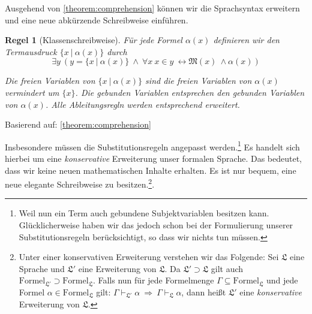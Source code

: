 \documentclass[a4paper,german,10pt,twoside]{book}
\newtheorem{rul}{Regel}
\theoremstyle{definition}
\theoremstyle{remark}
\begin{document}
\par
Ausgehend von \ref{theorem:comprehension} k{\"o}nnen wir die Sprachsyntax erweitern und eine neue abk{\"u}rzende Schreibweise einf{\"u}hren.

\begin{rul}[Klassenschreibweise]
\label{rule:classDefinition} \hypertarget{rule:classDefinition}{}
F{\"u}r jede Formel $\alpha(x)$ definieren wir den Termausdruck $\{ x \ | \ \alpha(x)\}$ durch 
$$
  \exists y \ (y = \{x \ | \ \alpha(x) \} \ \land \ \forall x \ x \in y \ \leftrightarrow \mathfrak{M}(x) \ \land \alpha(x))
$$

\par
Die freien Variablen von $\{ x \ | \ \alpha(x)\}$ sind die freien Variablen von $\alpha(x)$ vermindert um $\{ x \}$. Die gebunden Variablen entsprechen den gebunden Variablen von $\alpha(x)$. Alle Ableitungsregln werden entsprechend erweitert.
                
\end{rul}
Basierend auf: 
 \ref{theorem:comprehension}

Insbesondere m{\"u}ssen die Substitutionsregeln angepasst werden.\footnote{Weil nun ein Term auch gebundene Subjektvariablen besitzen kann. Gl{\"u}cklicherweise haben wir das jedoch schon bei der Formulierung unserer Substitutionsregeln ber{\"u}cksichtigt, so dass wir nichts tun m{\"u}ssen.} Es handelt sich hierbei um eine \emph{konservative} Erweiterung unser formalen Sprache. Das bedeutet, dass wir keine neuen mathematischen Inhalte erhalten. Es ist nur bequem, eine neue elegante Schreibweise zu besitzen.\footnote{
Unter einer konservativen Erweiterung  verstehen wir das Folgende: Sei $\mathfrak{L}$ eine Sprache und $\mathfrak{L'}$ eine Erweiterung von $\mathfrak{L}$. Da $\mathfrak{L'} \supset \mathfrak{L}$ gilt auch $\mbox{Formel}_\mathfrak{L'} \supset \mbox{Formel}_\mathfrak{L}$. Falls nun f{\"u}r jede Formelmenge $\Gamma \subseteq \mbox{Formel}_\mathfrak{L}$ und jede Formel $\alpha \in \mbox{Formel}_\mathfrak{L}$ gilt: $\Gamma \vdash_\mathfrak{L'} \alpha \ \Rightarrow \ \Gamma \vdash_\mathfrak{L} \alpha$, dann hei{\ss}t $\mathfrak{L'}$ eine \emph{konservative} Erweiterung von $\mathfrak{L}$.}.
\end{document}
